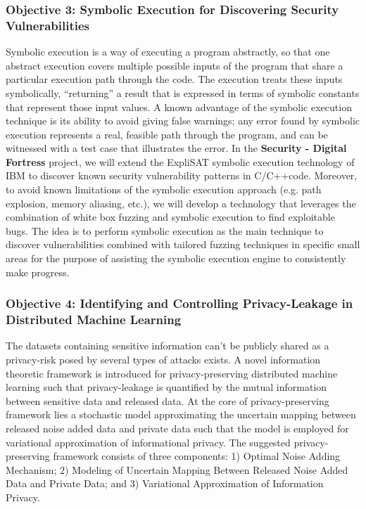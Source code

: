 \documentclass[a4paper,11pt]{article}
\newcommand{\project}[1]{\textbf{#1}\xspace}
\newcommand{\SECURITY}{\project{Security - Digital Fortress}}
\newcommand{\TheProject}{\SECURITY}
\begin{document}
\subsubsection*{Objective 3: Symbolic Execution for Discovering Security Vulnerabilities}
\vspace{-6pt}

Symbolic execution is a way of executing a program abstractly, so that one abstract execution covers multiple possible inputs of the program that share a particular execution path through the code. The execution treats these inputs symbolically, “returning” a result that is expressed in terms of symbolic constants that represent those input values.
A known advantage of the symbolic execution technique is its ability to avoid giving false warnings; any error found by symbolic execution represents a real, feasible path through the program, and can be witnessed with a test case that illustrates the error.
In the \TheProject{} project, we will extend the ExpliSAT symbolic execution technology of IBM to discover known security vulnerability patterns in C/C++code. Moreover, to avoid known limitations of the symbolic execution approach (e.g. path explosion, memory aliasing, etc.), we will develop a technology that leverages the combination of white box fuzzing and symbolic execution to find exploitable bugs. The idea is to perform symbolic execution as the main technique to discover vulnerabilities combined with tailored fuzzing techniques in specific small areas for the purpose of assisting the symbolic execution engine to consistently make progress.

\subsubsection*{Objective 4: Identifying and Controlling Privacy-Leakage in Distributed Machine Learning}
\vspace{-6pt}
The datasets containing sensitive information can't be publicly shared as a privacy-risk posed by several types of attacks exists. A novel information theoretic framework is introduced for privacy-preserving distributed machine learning such that privacy-leakage is quantified by the mutual information between sensitive data and released data. At the core of privacy-preserving framework lies a stochastic model approximating the uncertain mapping between released noise added data and private data such that the model is employed for variational approximation of informational privacy. The suggested privacy-preserving framework consists of three components: 1) Optimal Noise Adding Mechanism; 2) Modeling of Uncertain Mapping Between Released Noise Added Data and Private Data; and 3) Variational Approximation of Information Privacy. 
\end{document}
